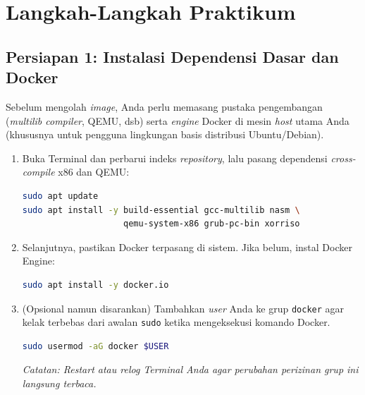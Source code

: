 \newpage
\section{Langkah-Langkah Praktikum}

\subsection{Persiapan 1: Instalasi Dependensi Dasar dan Docker}
\label{sec:m07-persiapan-install}
Sebelum mengolah \textit{image}, Anda perlu memasang pustaka pengembangan (\textit{multilib compiler}, QEMU, dsb) serta \textit{engine} Docker di mesin \textit{host} utama Anda (khususnya untuk pengguna lingkungan basis distribusi Ubuntu/Debian).
\begin{enumerate}
	\item Buka Terminal dan perbarui indeks \textit{repository}, lalu pasang dependensi \textit{cross-compile} x86 dan QEMU:
	      \begin{lstlisting}[language=bash, caption={Instalasi pustaka dasar dan perangkat virtual QEMU}]
sudo apt update
sudo apt install -y build-essential gcc-multilib nasm \
                    qemu-system-x86 grub-pc-bin xorriso
    \end{lstlisting}
	\item Selanjutnya, pastikan Docker terpasang di sistem. Jika belum, instal Docker Engine:
	      \begin{lstlisting}[language=bash, caption={Instalasi Docker Engine}]
sudo apt install -y docker.io
    \end{lstlisting}
	\item (Opsional namun disarankan) Tambahkan \textit{user} Anda ke grup \texttt{docker} agar kelak terbebas dari awalan \texttt{sudo} ketika mengeksekusi komando Docker.
	      \begin{lstlisting}[language=bash, caption={Konfigurasi hak otorisasi akses pengguna Docker}]
sudo usermod -aG docker $USER
    \end{lstlisting}
	      \textit{Catatan: \textit{Restart} atau \textit{relog} Terminal Anda agar perubahan perizinan grup ini langsung terbaca.}
\end{enumerate}

